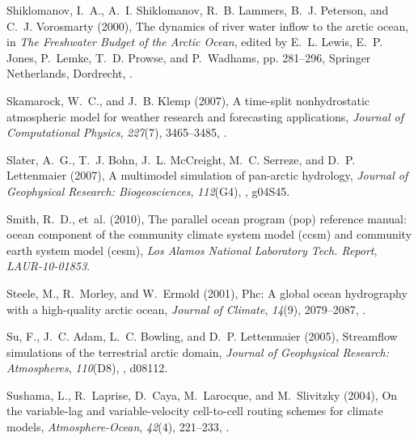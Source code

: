 \documentclass[jgrga, draft]{agutex}
\begin{document}
\begin{article}
\begin{thebibliography}{79}
Shiklomanov, I.~A., A.~I. Shiklomanov, R.~B. Lammers, B.~J. Peterson, and C.~J.
  Vorosmarty (2000), The dynamics of river water inflow to the arctic ocean, in
  \textit{The Freshwater Budget of the Arctic Ocean}, edited by E.~L. Lewis,
  E.~P. Jones, P.~Lemke, T.~D. Prowse, and P.~Wadhams, pp. 281--296, Springer
  Netherlands, Dordrecht, .

Skamarock, W.~C., and J.~B. Klemp (2007), A time-split nonhydrostatic
  atmospheric model for weather research and forecasting applications,
  \textit{Journal of Computational Physics}, \textit{227}(7), 3465--3485,
  .

Slater, A.~G., T.~J. Bohn, J.~L. McCreight, M.~C. Serreze, and D.~P.
  Lettenmaier (2007), A multimodel simulation of pan-arctic hydrology,
  \textit{Journal of Geophysical Research: Biogeosciences}, \textit{112}(G4),
  , g04S45.

Smith, R.~D., et~al. (2010), The parallel ocean program (pop) reference manual:
  ocean component of the community climate system model (ccsm) and community
  earth system model (cesm), \textit{Los Alamos National Laboratory Tech.
  Report}, \textit{LAUR-10-01853}.

Steele, M., R.~Morley, and W.~Ermold (2001), Phc: A global ocean hydrography
  with a high-quality arctic ocean, \textit{Journal of Climate},
  \textit{14}(9), 2079--2087,
  .

Su, F., J.~C. Adam, L.~C. Bowling, and D.~P. Lettenmaier (2005), Streamflow
  simulations of the terrestrial arctic domain, \textit{Journal of Geophysical
  Research: Atmospheres}, \textit{110}(D8), , d08112.

Sushama, L., R.~Laprise, D.~Caya, M.~Larocque, and M.~Slivitzky (2004), On the
  variable-lag and variable-velocity cell-to-cell routing schemes for climate
  models, \textit{Atmosphere-Ocean}, \textit{42}(4), 221--233,
  .


\end{thebibliography}
\end{article}
\end{document}
